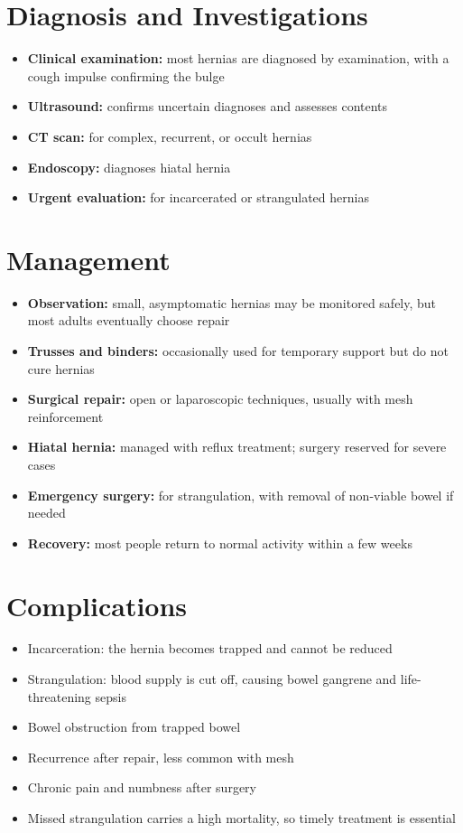 \section*{Diagnosis and Investigations}
\begin{itemize}
    \item \textbf{Clinical examination:} most hernias are diagnosed by examination, with a cough impulse confirming the bulge
    \item \textbf{Ultrasound:} confirms uncertain diagnoses and assesses contents
    \item \textbf{CT scan:} for complex, recurrent, or occult hernias
    \item \textbf{Endoscopy:} diagnoses hiatal hernia
    \item \textbf{Urgent evaluation:} for incarcerated or strangulated hernias
\end{itemize}

\section*{Management}
\begin{itemize}
    \item \textbf{Observation:} small, asymptomatic hernias may be monitored safely, but most adults eventually choose repair
    \item \textbf{Trusses and binders:} occasionally used for temporary support but do not cure hernias
    \item \textbf{Surgical repair:} open or laparoscopic techniques, usually with mesh reinforcement
    \item \textbf{Hiatal hernia:} managed with reflux treatment; surgery reserved for severe cases
    \item \textbf{Emergency surgery:} for strangulation, with removal of non-viable bowel if needed
    \item \textbf{Recovery:} most people return to normal activity within a few weeks
\end{itemize}

\section*{Complications}
\begin{itemize}
    \item Incarceration: the hernia becomes trapped and cannot be reduced
    \item Strangulation: blood supply is cut off, causing bowel gangrene and life-threatening sepsis
    \item Bowel obstruction from trapped bowel
    \item Recurrence after repair, less common with mesh
    \item Chronic pain and numbness after surgery
    \item Missed strangulation carries a high mortality, so timely treatment is essential
\end{itemize}

